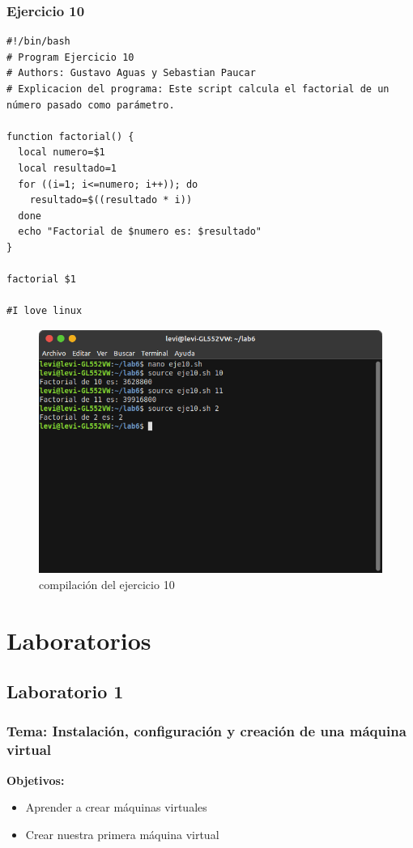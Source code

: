 \documentclass[11pt,twoside]{book}
\begin{document}
\subsection{Ejercicio 10}

\begin{lstlisting}
#!/bin/bash
# Program Ejercicio 10
# Authors: Gustavo Aguas y Sebastian Paucar
# Explicacion del programa: Este script calcula el factorial de un número pasado como parámetro.

function factorial() {
  local numero=$1
  local resultado=1
  for ((i=1; i<=numero; i++)); do
    resultado=$((resultado * i))
  done
  echo "Factorial de $numero es: $resultado"
}

factorial $1

#I love linux

\end{lstlisting}
\begin{figure}[h]
    \centering
    \includegraphics[width=0.8\linewidth]{img_tarea6/eje10con.png}
    \caption{ compilación del ejercicio 10}
\end{figure}

\newpage

\chapter{Laboratorios}
\section{Laboratorio 1}
\subsection{Tema: Instalación, configuración y creación de una máquina virtual}

\textbf{Objetivos:}
\begin{itemize}
  \item Aprender a crear máquinas virtuales
  \item Crear nuestra primera máquina virtual
\end{itemize}
\end{document}
